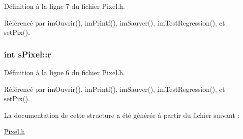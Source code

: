 Définition à la ligne 7 du fichier Pixel.h.



Référencé par imOuvrir(), imPrintf(), imSauver(), imTestRegression(), et setPix().

\hypertarget{structs_pixel_ac3c26bdba7b18fa49fef852d541fa03e}{
\subsubsection[{r}]{\setlength{\rightskip}{0pt plus 5cm}int {\bf sPixel::r}}}
\label{structs_pixel_ac3c26bdba7b18fa49fef852d541fa03e}


Définition à la ligne 6 du fichier Pixel.h.



Référencé par imOuvrir(), imPrintf(), imSauver(), imTestRegression(), et setPix().



La documentation de cette structure a été générée à partir du fichier suivant :\begin{DoxyCompactItemize}
\item 
\hyperlink{_pixel_8h}{Pixel.h}\end{DoxyCompactItemize}
